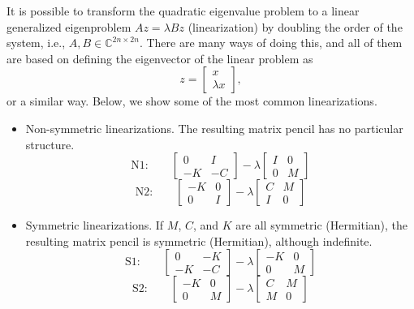 It is possible to transform the quadratic eigenvalue problem to a linear generalized eigenproblem $Az=\lambda Bz$ (linearization) by doubling the order of the system, i.e., $A,B\in\mathbb{C}^{2n\times 2n}$. There are many ways of doing this, and all of them are based on defining the eigenvector of the linear problem as 
\begin{equation}
\label{eq:linevec}
z=\left[\begin{array}{c}x\\\lambda x\end{array}\right],
\end{equation}
or a similar way. Below, we show some of the most common linearizations.

\begin{itemize}
\item Non-symmetric linearizations. The resulting matrix pencil has no particular structure.
\begin{equation}
\label{eq:n1}
\mbox{N1:}\qquad
\left[\begin{array}{cc}0 & I\\-K & -C\end{array}\right]-\lambda\left[\begin{array}{cc}I & 0\\0 & M\end{array}\right]
\end{equation}
\begin{equation}
\label{eq:n2}
\mbox{N2:}\qquad
\left[\begin{array}{cc}-K & 0\\0 & I\end{array}\right]-\lambda\left[\begin{array}{cc}C & M\\I & 0\end{array}\right]
\end{equation}

\medskip
\item Symmetric linearizations. If $M$, $C$, and $K$ are all symmetric (Hermitian), the resulting matrix pencil is symmetric (Hermitian), although indefinite.
\begin{equation}
\label{eq:s1}
\mbox{S1:}\qquad
\left[\begin{array}{cc}0 & -K\\-K & -C\end{array}\right]-\lambda\left[\begin{array}{cc}-K & 0\\0 & M\end{array}\right]
\end{equation}
\begin{equation}
\label{eq:s2}
\mbox{S2:}\qquad
\left[\begin{array}{cc}-K & 0\\0 & M\end{array}\right]-\lambda\left[\begin{array}{cc}C & M\\ M & 0\end{array}\right]
\end{equation}


\end{itemize}
